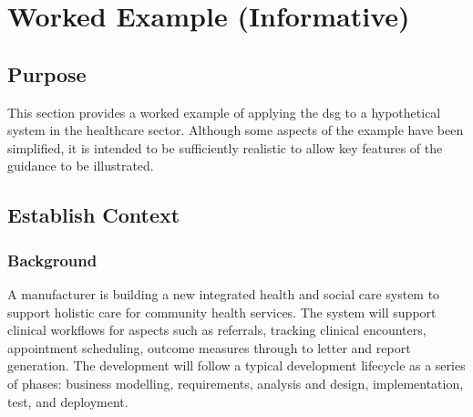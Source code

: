 %
%
\chapter{Worked Example (Informative)} \label{bkm:workedexample}


\section{Purpose}
This section provides a worked example of applying the \gls{dsg} to a hypothetical system in the healthcare sector. Although some aspects of the example have been simplified, it is intended to be sufficiently realistic to allow key features of the guidance to be illustrated.

\section{Establish Context}

\subsection{Background}
A manufacturer is building a new integrated health and social care system to support holistic care for community health services. The system will support clinical workflows for aspects such as referrals, tracking clinical encounters, appointment scheduling, outcome measures through to letter and report generation. The development will follow a typical development lifecycle as a series of phases: business modelling, requirements, analysis and design, implementation, test, and deployment. 

